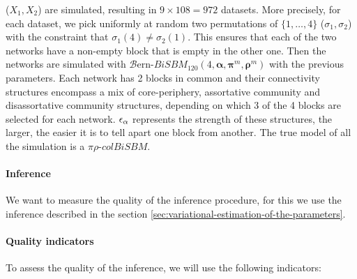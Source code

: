 (\(X_1, X_2\)) are simulated, resulting in \(9 \times 108 = 972\)
datasets. More precisely, for each dataset, we pick uniformly at random
two permutations of \(\{ 1, \dots , 4 \}\) (\(\sigma_1, \sigma_2\)) with
the constraint that \(\sigma_1(4) \neq \sigma_2(1)\). This ensures that
each of the two networks have a non-empty block that is empty in the
other one. Then the networks are simulated with
\(\mathcal{B}\)ern-\(BiSBM_{120}(4, \bm{\alpha}, \bm{\pi}^m, \bm{\rho}^m)\)
with the previous parameters. Each network has 2 blocks in common and
their connectivity structures encompass a mix of core-periphery,
assortative community and disassortative community structures, depending
on which 3 of the 4 blocks are selected for each network.
\(\eps[\alpha]\) represents the strength of these structures, the
larger, the easier it is to tell apart one block from another. The true
model of all the simulation is a \(\pi\rho\text{-}colBiSBM\).

\paragraph{Inference}

We want to measure the quality of the inference procedure, for this we
use the inference described in the section
\ref{sec:variational-estimation-of-the-parameters}.

\paragraph{Quality indicators}

To assess the quality of the inference, we will use the following
indicators:


